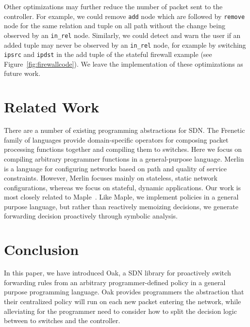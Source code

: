\documentclass[preprint]{sigplanconf}
\begin{document}
Other optimizations may further reduce the number of packet sent to the controller. For example, we could remove \lstinline|add| node which are followed by \lstinline|remove| node for the same relation and tuple on all path without the change being observed by an \lstinline|in_rel| node. Similarly, we could detect and warn the user if an added tuple may never be observed by an \lstinline|in_rel| node, for example by switching \lstinline|ipsrc| and \lstinline|ipdst| in the add tuple of the stateful firewall example (see Figure~\ref{fig:firewallcode}). We leave the implementation of these optimizations as future work.




\section*{Related Work}
There are a number of existing programming abstractions for SDN. The Frenetic~\citep{Frenetic} family of languages provide domain-specific operators for composing packet processing functions together and compiling them to switches. Here we focus on compiling arbitrary programmer functions in a general-purpose language. Merlin~\cite{Merlin} is a language for configuring networks based on path and quality of service constraints. However, Merlin focuses mainly on stateless, static network configurations, whereas we focus on stateful, dynamic applications. Our work is most closely related to Maple~\citep{Maple}. Like Maple, we implement policies in a general purpose language, but rather than reactively memoizing decisions, we generate forwarding decision proactively through symbolic analysis.


\section*{Conclusion}
In this paper, we have introduced Oak, a SDN library for proactively switch forwarding rules
from an arbitrary programmer-defined policy in a general purpose programming language.
Oak provides programmers the abstraction that their centralized policy will run on each 
new packet entering the network, while alleviating for the programmer need to consider
how to split the decision logic between to switches and the controller.
\end{document}
